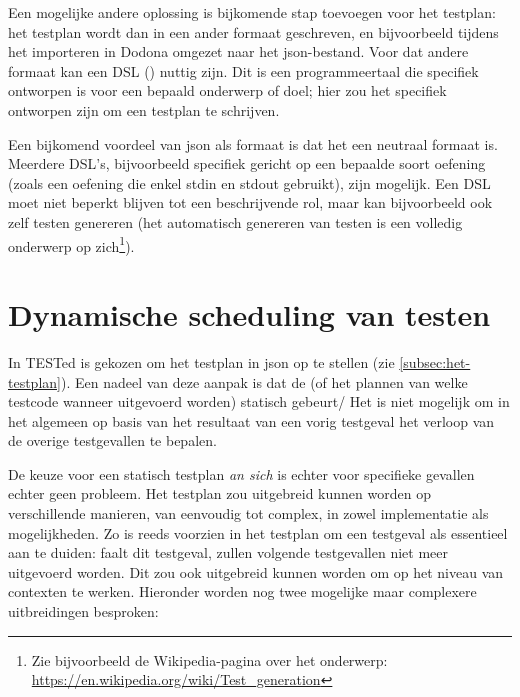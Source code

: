 Een mogelijke andere oplossing is bijkomende stap toevoegen voor het testplan: het testplan wordt dan in een ander formaat geschreven, en bijvoorbeeld tijdens het importeren in Dodona omgezet naar het json-bestand.
Voor dat andere formaat kan een DSL () nuttig zijn.
Dit is een programmeertaal die specifiek ontworpen is voor een bepaald onderwerp of doel;
hier zou het specifiek ontworpen zijn om een testplan te schrijven.

Een bijkomend voordeel van json als formaat is dat het een neutraal formaat is.
Meerdere DSL's, bijvoorbeeld specifiek gericht op een bepaalde soort oefening (zoals een oefening die enkel stdin en stdout gebruikt), zijn mogelijk.
Een DSL moet niet beperkt blijven tot een beschrijvende rol, maar kan bijvoorbeeld ook zelf testen genereren (het automatisch genereren van testen is een volledig onderwerp op zich\footnote{Zie bijvoorbeeld de Wikipedia-pagina over het onderwerp: \url{https://en.wikipedia.org/wiki/Test_generation}}).

\section{Dynamische scheduling van testen}\label{sec:dynamisch-schedulen-van-testgevallen}

In TESTed is gekozen om het testplan in json op te stellen (zie \cref{subsec:het-testplan}).
Een nadeel van deze aanpak is dat de  (of het plannen van welke testcode wanneer uitgevoerd worden) statisch gebeurt/
Het is niet mogelijk om in het algemeen op basis van het resultaat van een vorig testgeval het verloop van de overige testgevallen te bepalen.

De keuze voor een statisch testplan \emph{an sich} is echter voor specifieke gevallen echter geen probleem.
Het testplan zou uitgebreid kunnen worden op verschillende manieren, van eenvoudig tot complex, in zowel implementatie als mogelijkheden.
Zo is reeds voorzien in het testplan om een testgeval als essentieel aan te duiden: faalt dit testgeval, zullen volgende testgevallen niet meer uitgevoerd worden.
Dit zou ook uitgebreid kunnen worden om op het niveau van contexten te werken.
Hieronder worden nog twee mogelijke maar complexere uitbreidingen besproken:

